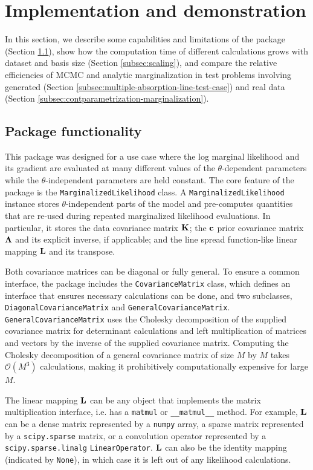 \documentclass[manuscript]{aastex62}
\newcommand{\vx}[1]{{\bf {#1}}}
\begin{document}
\section{Implementation and demonstration}
\label{sec:package-and-demos}

In this section, we describe some capabilities and limitations of the package (Section \ref{subsec:package-functionality}), show how the computation time of different calculations grows with dataset and basis size (Section \ref{subsec:scaling}), and compare the relative efficiencies of MCMC and analytic marginalization in test problems involving generated (Section \ref{subsec:multiple-absorption-line-test-case}) and real data (Section \ref{subsec:contparametrization-marginalization}).

\subsection{Package functionality}
\label{subsec:package-functionality}
This package was designed for a use case where the log marginal likelihood and its gradient are evaluated at many different values of the $\theta$-dependent parameters while the $\theta$-independent parameters are held constant.
The core feature of the package is the \texttt{MarginalizedLikelihood} class.
A \texttt{MarginalizedLikelihood} instance stores $\theta$-independent parts of the model and pre-computes quantities that are re-used during repeated marginalized likelihood evaluations.
In particular, it stores the data covariance matrix $\vx{K}$; the $\vx{c}$ prior covariance matrix $\vx{\Lambda}$ and its explicit inverse, if applicable; and the line spread function-like linear mapping $\vx{L}$ and its transpose.

Both covariance matrices can be diagonal or fully general.
To ensure a common interface, the package includes the \texttt{CovarianceMatrix} class, which defines an interface that ensures necessary calculations can be done, and two subclasses, \texttt{DiagonalCovarianceMatrix} and \texttt{GeneralCovarianceMatrix}.
\texttt{GeneralCovarianceMatrix} uses the Cholesky decomposition of the supplied covariance matrix for determinant calculations and left multiplication of matrices and vectors by the inverse of the supplied covariance matrix.
Computing the Cholesky decomposition of a general covariance matrix of size $M$ by $M$ takes $\mathcal{O}(M^3)$ calculations, making it prohibitively computationally expensive for large $M$.

The linear mapping $\vx{L}$ can be any object that implements the matrix multiplication interface, i.e. has a \texttt{matmul} or \texttt{\_\_matmul\_\_} method.
For example, $\vx{L}$ can be a dense matrix represented by a \texttt{numpy} array, a sparse matrix represented by a \texttt{scipy.sparse} matrix, or a convolution operator represented by a \texttt{scipy.sparse.linalg} \texttt{LinearOperator}.
$\vx{L}$ can also be the identity mapping (indicated by \texttt{None}), in which case it is left out of any likelihood calculations.
\end{document}
